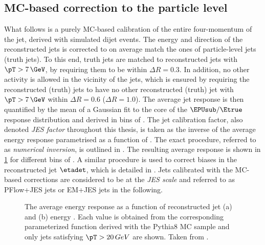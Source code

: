 \subsection{MC-based correction to the particle level}
What follows is a purely MC-based calibration of the entire four-momentum of the jet, derived with simulated dijet events. The energy and direction of the reconstructed jets is corrected to on average match the ones of particle-level jets (truth jets).
To this end, truth jets are matched to reconstructed jets with $\pT > 7\,\GeV$, by requiring them to be within $\Delta R = 0.3$. In addition, no other activity is allowed in the vicinity of the jets, which is ensured by requiring the reconstructed (truth) jets to have no other reconstructed (truth) jet with $\pT > 7\,\GeV$ within $\Delta R = 0.6$ ($\Delta R = 1.0$).
The average jet response is then quantified by the mean of a Gaussian fit to the core of the $\EPUsub / \Etrue$ response distribution and derived in bins of \Etrue.
The jet calibration factor, also denoted \emph{JES factor} throughout this thesis, is taken as the inverse of the average energy response parametrised as a function of \EPUsub.
The exact procedure, referred to as \emph{numerical inversion}, is outlined in . The resulting average response is shown in \cref{fig:jes-calibration-jet-response} for different bins of \etadet. A similar procedure is used to correct biases in the reconstructed jet $\etadet$, which is detailed in .
Jets calibrated with the MC-based corrections are considered to be at the \emph{JES scale} and referred to as PFlow+JES jets or EM+JES jets in the following.

\begin{figure}
    \caption{The average energy response as a function of reconstructed jet (a) \etadet and (b) energy \Ereco. Each value is obtained from the corresponding parameterized function derived with the Pythia8 MC sample and only jets satisfying $\pT > 20\,GeV$ are shown. Taken from .}
    \label{fig:jes-calibration-jet-response}
\end{figure}

